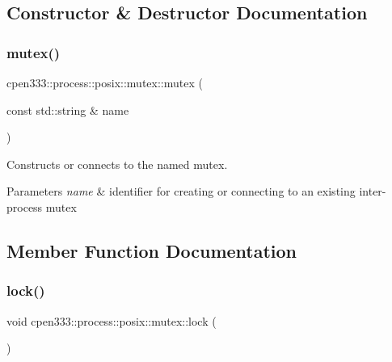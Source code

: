 \subsection{Constructor \& Destructor Documentation}
\mbox{\label{classcpen333_1_1process_1_1posix_1_1mutex_a72ecaf79b2e4ea585b542dc0ed240614}} 
\subsubsection{\texorpdfstring{mutex()}{mutex()}}
{\footnotesize\ttfamily cpen333\+::process\+::posix\+::mutex\+::mutex (\begin{DoxyParamCaption}\item[{const std\+::string \&}]{name }\end{DoxyParamCaption})\hspace{0.3cm}{\ttfamily [inline]}}



Constructs or connects to the named mutex. 


\begin{DoxyParams}{Parameters}
{\em name} & identifier for creating or connecting to an existing inter-\/process mutex \\
\hline
\end{DoxyParams}


\subsection{Member Function Documentation}
\mbox{\label{classcpen333_1_1process_1_1posix_1_1mutex_a07dccda80dc88292fa490ce47dd0faa6}} 
\subsubsection{\texorpdfstring{lock()}{lock()}}
{\footnotesize\ttfamily void cpen333\+::process\+::posix\+::mutex\+::lock (\begin{DoxyParamCaption}{ }\end{DoxyParamCaption})\hspace{0.3cm}{\ttfamily [inline]}}



